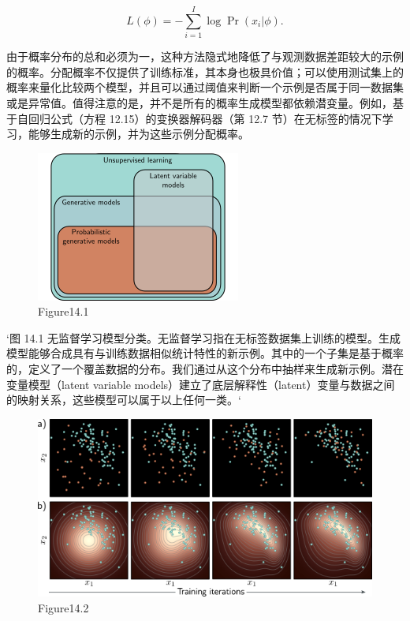 \begin{equation}
L(\phi) = -\sum_{i=1}^{I} \log \Pr(x_i|\phi) .
\end{equation}

由于概率分布的总和必须为一，这种方法隐式地降低了与观测数据差距较大的示例的概率。分配概率不仅提供了训练标准，其本身也极具价值；可以使用测试集上的概率来量化比较两个模型，并且可以通过阈值来判断一个示例是否属于同一数据集或是异常值。值得注意的是，并不是所有的概率生成模型都依赖潜变量。例如，基于自回归公式（方程 12.15）的变换器解码器（第 12.7 节）在无标签的情况下学习，能够生成新的示例，并为这些示例分配概率。

\begin{figure}[ht!]
\centering
\includegraphics[width=0.7\linewidth]{png/chapter14/UnsupOverview.png}
\caption{Figure14.1}
\end{figure}

`图 14.1 无监督学习模型分类。无监督学习指在无标签数据集上训练的模型。生成模型能够合成具有与训练数据相似统计特性的新示例。其中的一个子集是基于概率的，定义了一个覆盖数据的分布。我们通过从这个分布中抽样来生成新示例。潜在变量模型（latent variable models）建立了底层解释性（latent）变量与数据之间的映射关系，这些模型可以属于以上任何一类。`

\begin{figure}[ht!]
\centering
\includegraphics[width=0.7\linewidth]{png/chapter14/UnsupLearning.png}
\caption{Figure14.2}
\end{figure}

